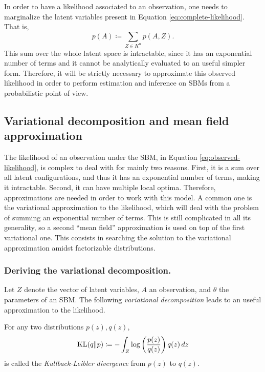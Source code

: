 \documentclass[../../main.tex]{subfiles} %
\begin{document}
In order to have a likelihood associated to an observation, one needs to 
marginalize the latent variables present in Equation 
\eqref{eq:complete-likelihood}. That is,
\begin{equation} \label{eq:observed-likelihood}
	p(A) \coloneqq \sum_{Z \in K^n} p(A, Z).
\end{equation}
This sum over the whole latent space is intractable, since it has an 
exponential number of terms and it cannot be analytically evaluated to an 
useful simpler form. Therefore, it will be strictly necessary to approximate 
this observed likelihood in order to perform estimation and inference on SBMs 
from a probabilistic point of view.

\subsection{Variational decomposition and mean 
field approximation}
The likelihood of an observation under the SBM, in Equation 
\eqref{eq:observed-likelihood}, is complex to deal with for mainly two reasons. 
First, it is a sum over all latent configurations, and thus it has an 
exponential number of terms, making it intractable. Second, it can have 
multiple local optima. Therefore, approximations are needed in order to work 
with this model. A common one is the variational approximation to the 
likelihood, which will deal with the problem of summing an exponential number 
of terms. This is still complicated in all its generality, so a second ``mean 
field'' approximation is used on top of the first variational one. This 
consists in searching the solution to the variational approximation amidst 
factorizable distributions.

\subsubsection{Deriving the variational 
decomposition.}
Let \(Z\) denote the vector of latent variables, \(A\) an 
observation, and \(\theta\) the parameters of an SBM. The following 
\textit{variational decomposition} leads to an useful approximation to the 
likelihood.

\begin{definition}
	For any two distributions \(p(z), q(z)\),
	\begin{equation}
		\operatorname{KL} (q \Vert p) \coloneqq -
		\int_{Z} \log \left( \frac{p (z)}{q(z)}
		\right) q(z) \, dz
	\end{equation}
	is called the \textit{Kullback-Leibler divergence} from \(p(z)\) to 
	\(q(z)\).
\end{definition}
\end{document}
